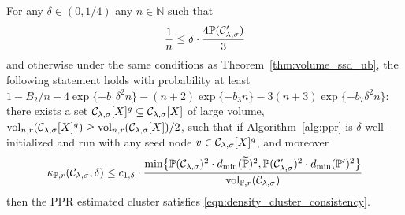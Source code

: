 \begin{theorem}
	\label{thm:density_cluster_consistent_recovery}
	For any $\delta \in (0,1/4)$ any $n \in \mathbb{N}$ such that
	\begin{equation}
	\label{eqn:density_cluster_consistent_recovery_sample_complexity}
	\frac{1}{n} \leq \delta \cdot \frac{4\mathbb{P}(\mathcal{C}_{\lambda,\sigma}')}{3}
	\end{equation} 
	and otherwise under the same conditions as Theorem~\ref{thm:volume_ssd_ub}, the following statement holds with probability at least $1 - B_2/n - 4\exp\{-b_1\delta^2n\} - (n + 2)\exp\{-b_3n\} - 3(n + 3)\exp\{-b_7\delta^2n\}$: there exists a set $\mathcal{C}_{\lambda,\sigma}[X]^g \subseteq \mathcal{C}_{\lambda,\sigma}[X]$ of large volume, $\mathrm{vol}_{n,r}(\mathcal{C}_{\lambda,\sigma}[X]^g) \geq \mathrm{vol}_{n,r}(\mathcal{C}_{\lambda,\sigma}[X])/2$, such that if Algorithm~\ref{alg:ppr} is $\delta$-well-initialized and run with any seed node $v \in \mathcal{C}_{\lambda,\sigma}[X]^g$, and moreover
	\begin{equation}
	\label{eqn:density_cluster_consistent_recovery_condition}
	\kappa_{\mathbb{P},r}(\mathcal{C}_{\lambda,\sigma},\delta) \leq c_{1,\delta} \cdot \frac{\min\bigl\{\mathbb{P}(\mathcal{C}_{\lambda,\sigma})^2 \cdot d_{\min}(\widetilde{\mathbb{P}})^2, \mathbb{P}(\mathcal{C}_{\lambda,\sigma}')^2 \cdot d_{\min}(\mathbb{P}')^2\bigl\}}{\mathrm{vol}_{\mathbb{P},r}(\mathcal{C}_{\lambda,\sigma})}
	\end{equation}
	then the PPR estimated cluster  satisfies \eqref{eqn:density_cluster_consistency}.
\end{theorem}

